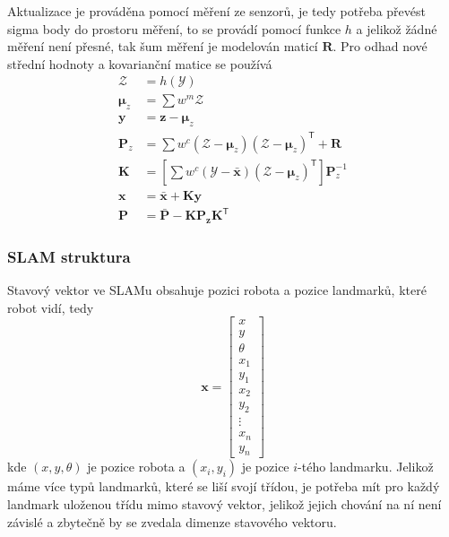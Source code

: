 \documentclass[a4paper,12pt]{article}
\begin{document}
Aktualizace je prováděna pomocí měření ze senzorů, je tedy potřeba převést sigma body do prostoru měření, 
to se provádí pomocí funkce $h$ a jelikož žádné měření není přesné, tak šum měření je modelován maticí $\mathbf R$.
Pro odhad nové střední hodnoty a kovarianční matice se používá 
\begin{equation}
    \begin{aligned}
        \boldsymbol{\mathcal Z} &=  h(\boldsymbol{\mathcal{Y}}) \\
        \boldsymbol\mu_z &= \sum w^m\boldsymbol{\mathcal{Z}} \\
        \mathbf y &= \mathbf z - \boldsymbol\mu_z \\
        \mathbf P_z &= \sum w^c{(\boldsymbol{\mathcal Z}-\boldsymbol\mu_z)(\boldsymbol{\mathcal{Z}}-\boldsymbol\mu_z)^\mathsf{T}} + \mathbf R \\ 
        \mathbf K &= \left[\sum w^c(\boldsymbol{\mathcal Y}-\bar{\mathbf x})(\boldsymbol{\mathcal{Z}}-\boldsymbol\mu_z)^\mathsf{T}\right] \mathbf P_z^{-1} \\
        \mathbf x &= \mathbf{\bar x} + \mathbf{Ky}\\
        \mathbf P &= \bar{\mathbf P} - \mathbf{KP_z}\mathbf{K}^\mathsf{T}
    \end{aligned}
\end{equation}

\subsubsection{SLAM struktura}
Stavový vektor ve SLAMu obsahuje pozici robota a pozice landmarků, které robot vidí, tedy 
\begin{equation}
    \mathbf x = \begin{bmatrix}
        x \\
        y \\
        \theta \\
        x_1 \\
        y_1 \\
        x_2 \\
        y_2 \\
        \vdots \\
        x_n \\
        y_n 
    \end{bmatrix}
\end{equation}
kde $(x,y, \theta)$ je pozice robota a $(x_i,y_i)$ je pozice $i$-tého landmarku.
Jelikož máme více typů landmarků, které se liší svojí třídou, je potřeba mít pro každý landmark uloženou třídu mimo stavový vektor, 
jelikož jejich chování na ní není závislé a zbytečně by se zvedala dimenze stavového vektoru.
\end{document}
